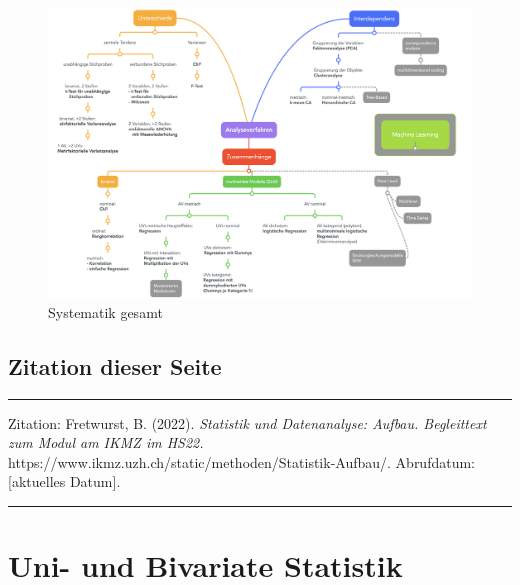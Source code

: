 \documentclass[
  10pt,
  letterpaper,
  a4paper, twoside]{scrreprt}
\begin{document}
\begin{figure}[H]

{\centering \includegraphics[width=1\textwidth,height=\textheight]{images/Analyseschema-total2.png}

}

\caption{Systematik gesamt}

\end{figure}%

\section*{Zitation dieser Seite}\label{zitation-dieser-seite}


\begin{center}\rule{0.5\linewidth}{0.5pt}\end{center}

Zitation: Fretwurst, B. (2022). \emph{Statistik und Datenanalyse:
Aufbau. Begleittext zum Modul am IKMZ im HS22.}
https://www.ikmz.uzh.ch/static/methoden/Statistik-Aufbau/. Abrufdatum:
{[}aktuelles Datum{]}.

\begin{center}\rule{0.5\linewidth}{0.5pt}\end{center}


\chapter{Uni- und Bivariate
Statistik}\label{uni--und-bivariate-statistik}
\end{document}
